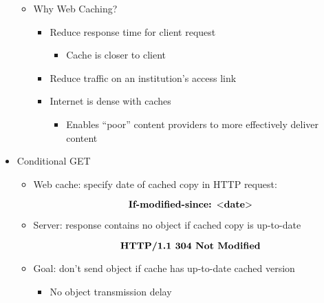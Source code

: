 \begin{itemize}
\begin{itemize}
      \item Why Web Caching?

        \begin{itemize}

          \item Reduce response time for client request

            \begin{itemize}

              \item Cache is closer to client

            \end{itemize}

          \item Reduce traffic on an institution's access link

          \item Internet is dense with caches

            \begin{itemize}

              \item Enables ``poor'' content providers to more effectively deliver content

            \end{itemize}

        \end{itemize}

    \end{itemize}

  \item Conditional GET

    \begin{itemize}

      \item Web cache: specify date of cached copy in HTTP request:

        $$\text{\textbf{If-modified-since: $<$date$>$}}$$

      \item Server: response contains no object if cached copy is up-to-date

        $$\text{\textbf{HTTP/1.1 304 Not Modified}}$$

      \item Goal: don't send object if cache has up-to-date cached version

        \begin{itemize}

          \item No object transmission delay


\end{itemize}
\end{itemize}
\end{itemize}
